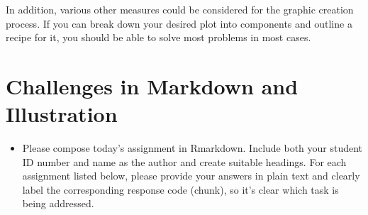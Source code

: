 \documentclass[
  a4paper,
]{book}
\providecommand{\tightlist}{%
  \setlength{\itemsep}{0pt}\setlength{\parskip}{0pt}}\usepackage{longtable,booktabs,array}
\begin{document}
In addition, various other measures could be considered for the graphic
creation process. If you can break down your desired plot into
components and outline a recipe for it, you should be able to solve most
problems in most cases.

\section{Challenges in Markdown and
Illustration}\label{challenges-in-markdown-and-illustration}

\begin{itemize}
\tightlist
\item
  Please compose today's assignment in Rmarkdown. Include both your
  student ID number and name as the author and create suitable headings.
  For each assignment listed below, please provide your answers in plain
  text and clearly label the corresponding response code (chunk), so
  it's clear which task is being addressed.
\end{itemize}
\end{document}
